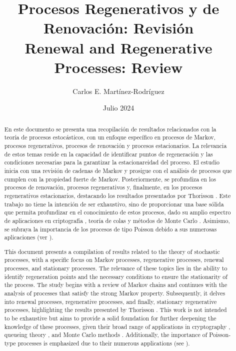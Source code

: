 \documentclass{article}
\title{Procesos Regenerativos y de Renovación: Revisión\\
\small{Renewal and Regenerative Processes: Review}}
\author{Carlos E. Martínez-Rodríguez}
\date{Julio 2024}
\renewcommand{\abstractname}{Resumen}
\numberwithin{equation}{section}
\begin{document}
\maketitle

\begin{abstract}
En este documento se presenta una recopilación de resultados relacionados con la teoría de procesos estocásticos, con un enfoque específico en procesos de Markov, procesos regenerativos, procesos de renovación y procesos estacionarios. La relevancia de estos temas reside en la capacidad de identificar puntos de regeneración y las condiciones necesarias para la garantizar la estacionareidad del proceso. El estudio inicia con una revisión de cadenas de Markov y prosigue con el análisis de procesos que cumplen con la propiedad fuerte de Markov. Posteriormente, se profundiza en los procesos de renovación, procesos regenerativos y, finalmente, en los procesos regenerativos estacionarios, destacando los resultados presentados por Thorisson \cite{Thorisson}. Este trabajo no tiene la intención de ser exhaustivo, sino de proporcionar una base sólida que permita profundizar en el conocimiento de estos procesos, dado su amplio espectro de aplicaciones en criptografía \cite{Portman}, teoría de colas \cite{Morozov} y métodos de Monte Carlo \cite{Xu}. Asimismo, se subraya la importancia de los procesos de tipo Poisson debido a sus numerosas aplicaciones (ver \cite{Douc}).
\end{abstract}

\begin{otherlanguage}{english}
\renewcommand{\abstractname}{Abstract} %
\begin{abstract}
This document presents a compilation of results related to the theory of stochastic processes, with a specific focus on Markov processes, regenerative processes, renewal processes, and stationary processes. The relevance of these topics lies in the ability to identify regeneration points and the necessary conditions to ensure the stationarity of the process. The study begins with a review of Markov chains and continues with the analysis of processes that satisfy the strong Markov property. Subsequently, it delves into renewal processes, regenerative processes, and finally, stationary regenerative processes, highlighting the results presented by Thorisson \cite{Thorisson}. This work is not intended to be exhaustive but aims to provide a solid foundation for further deepening the knowledge of these processes, given their broad range of applications in cryptography \cite{Portman}, queueing theory \cite{Morozov}, and Monte Carlo methods \cite{Xu}. Additionally, the importance of Poisson-type processes is emphasized due to their numerous applications (see \cite{Douc}).
\end{abstract}
\end{otherlanguage}
\end{document}
